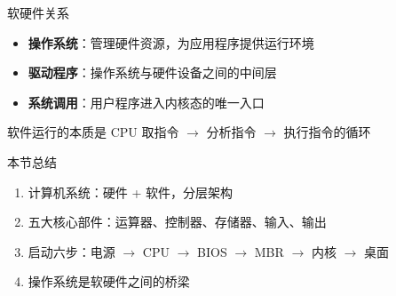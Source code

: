 \documentclass[10pt, aspectratio=169]{beamer}
\begin{document}
\begin{frame}{软硬件关系}
    \begin{itemize}
        \item \textbf{操作系统}：管理硬件资源，为应用程序提供运行环境
        \item \textbf{驱动程序}：操作系统与硬件设备之间的中间层
        \item \textbf{系统调用}：用户程序进入内核态的唯一入口
    \end{itemize}
    \vspace{0.5em}
    软件运行的本质是 CPU 取指令 $\to$ 分析指令 $\to$ 执行指令的循环
\end{frame}

\begin{frame}{本节总结}
    \begin{enumerate}
        \item 计算机系统：硬件 + 软件，分层架构
        \item 五大核心部件：运算器、控制器、存储器、输入、输出
        \item 启动六步：电源 $\to$ CPU $\to$ BIOS $\to$ MBR $\to$ 内核 $\to$ 桌面
        \item 操作系统是软硬件之间的桥梁
    \end{enumerate}
\end{frame}
\end{document}
